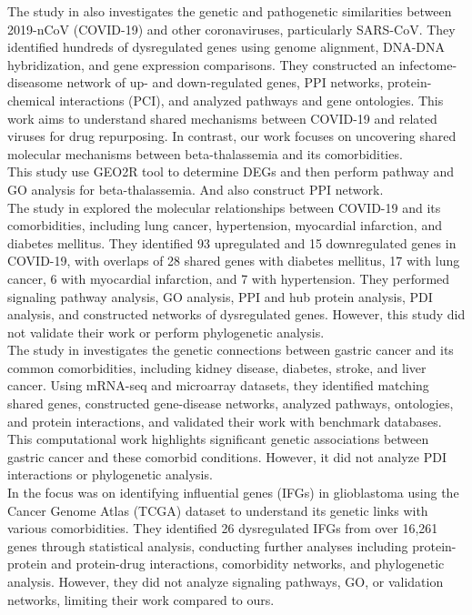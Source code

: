 The study in \cite{b11} also investigates the genetic and pathogenetic similarities between 2019-nCoV (COVID-19) and other coronaviruses, particularly SARS-CoV. They identified hundreds of dysregulated genes using genome alignment, DNA-DNA hybridization, and gene expression comparisons. They constructed an infectome-diseasome network of up- and down-regulated genes, PPI networks, protein-chemical interactions (PCI), and analyzed pathways and gene ontologies. This work aims to understand shared mechanisms between COVID-19 and related viruses for drug repurposing. In contrast, our work focuses on uncovering shared molecular mechanisms between beta-thalassemia and its comorbidities.\\

\cite{b12} This study use GEO2R tool to determine DEGs and then perform pathway and GO analysis for beta-thalassemia. And also construct PPI network.\\

The study in \cite{b14} explored the molecular relationships between COVID-19 and its comorbidities, including lung cancer, hypertension, myocardial infarction, and diabetes mellitus. They identified 93 upregulated and 15 downregulated genes in COVID-19, with overlaps of 28 shared genes with diabetes mellitus, 17 with lung cancer, 6 with myocardial infarction, and 7 with hypertension. They performed signaling pathway analysis, GO analysis, PPI and hub protein analysis, PDI analysis, and constructed networks of dysregulated genes. However, this study did not validate their work or perform phylogenetic analysis.\\

The study in \cite{b15} investigates the genetic connections between gastric cancer and its common comorbidities, including kidney disease, diabetes, stroke, and liver cancer. Using mRNA-seq and microarray datasets, they identified matching shared genes, constructed gene-disease networks, analyzed pathways, ontologies, and protein interactions, and validated their work with benchmark databases. This computational work highlights significant genetic associations between gastric cancer and these comorbid conditions. However, it did not analyze PDI interactions or phylogenetic analysis.\\

In \cite{b18} the focus was on identifying influential genes (IFGs) in glioblastoma using the Cancer Genome Atlas (TCGA) dataset to understand its genetic links with various comorbidities. They identified 26 dysregulated IFGs from over 16,261 genes through statistical analysis, conducting further analyses including protein-protein and protein-drug interactions, comorbidity networks, and phylogenetic analysis. However, they did not analyze signaling pathways, GO, or validation networks, limiting their work compared to ours.\\

